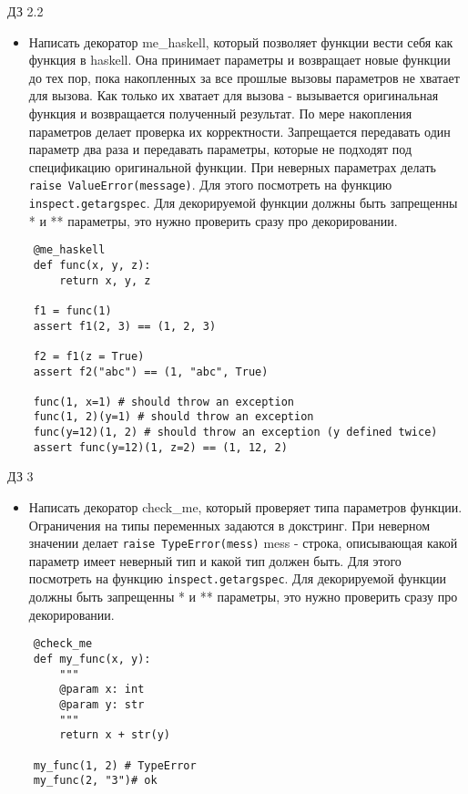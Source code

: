 \documentclass{article}
\begin{document}
{\center ДЗ 2.2}
\begin{itemize}
    \item Написать декоратор me\_haskell, который позволяет функции вести себя как функция в haskell.
        Она принимает параметры и возвращает новые функции до тех пор, пока накопленных
        за все прошлые вызовы параметров не хватает для вызова. Как только их хватает для 
        вызова - вызывается оригинальная функция и возвращается полученный результат.
        По мере накопления параметров делает проверка их корректности. 
        Запрещается передавать один параметр два раза и передавать параметры, которые не 
        подходят под спецификацию оригинальной функции. При неверных параметрах
        делать \lstinline!raise ValueError(message)!. 
        Для этого посмотреть на функцию \lstinline!inspect.getargspec!.
        Для декорируемой функции должны быть запрещенны * и ** параметры, это
        нужно проверить сразу про декорировании.
\end{itemize}
\vspace{15pt}
\begin{lstlisting}
    @me_haskell
    def func(x, y, z):
        return x, y, z

    f1 = func(1)
    assert f1(2, 3) == (1, 2, 3)
    
    f2 = f1(z = True)
    assert f2("abc") == (1, "abc", True)

    func(1, x=1) # should throw an exception
    func(1, 2)(y=1) # should throw an exception
    func(y=12)(1, 2) # should throw an exception (y defined twice)
    assert func(y=12)(1, z=2) == (1, 12, 2)
\end{lstlisting}
\newpage

{\center ДЗ 3}
\begin{itemize}
    \item Написать декоратор check\_me, который проверяет типа параметров функции.
        Ограничения на типы переменных задаются в докстринг. При неверном
        значении делает \lstinline!raise TypeError(mess)! mess - строка,
        описывающая какой параметр имеет неверный тип и какой тип должен быть.
        Для этого посмотреть на функцию \lstinline!inspect.getargspec!.
        Для декорируемой функции должны быть запрещенны * и ** параметры, это
        нужно проверить сразу про декорировании.
\end{itemize}

\vspace{15pt}
\begin{lstlisting}
    @check_me
    def my_func(x, y):
        """
        @param x: int
        @param y: str
        """
        return x + str(y)

    my_func(1, 2) # TypeError
    my_func(2, "3")# ok
\end{lstlisting}
\newpage

\end{document}
